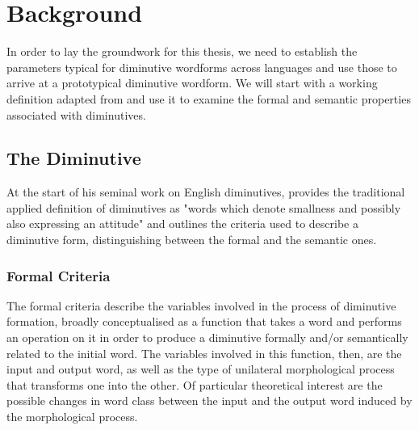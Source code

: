 \chapter{Background}\label{background} 
In order to lay the groundwork for this thesis, we need to establish the parameters typical for diminutive wordforms across languages and use those to arrive at a prototypical diminutive wordform. We will start with a working definition adapted from \cite{Schneider+2003} and use it to examine the formal and semantic properties associated with diminutives. 

\section{The Diminutive}

At the start of his seminal \citeyear{Schneider+2003} work on English diminutives, \citeauthor{Schneider+2003} provides the traditional applied definition of diminutives as "words which denote smallness and possibly also expressing an attitude" \parencite[p.4]{Schneider+2003} and outlines the criteria used to describe a diminutive form, distinguishing between the formal and the semantic ones. 

\subsection{Formal Criteria}
\label{subsec:2-formal-crit}
The formal criteria describe the variables involved in the process of diminutive formation, broadly conceptualised as a function that takes a word and performs an operation on it in order to produce a diminutive formally and/or semantically related to the initial word. The variables involved in this function, then, are the input and output word, as well as the type of unilateral morphological process that transforms one into the other. Of particular theoretical interest are the possible changes in word class between the input and the output word induced by the morphological process. 

